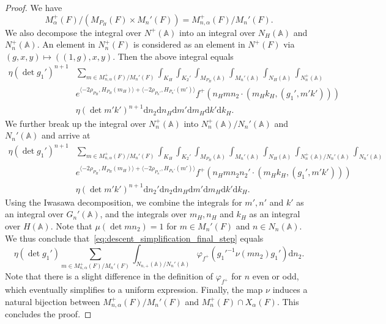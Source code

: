 \documentclass[10pt,a4paper]{amsart}
\newcommand{\bA}{\mathbb{A}}
\newcommand{\rd}{\mathrm{d}}
\begin{document}
\begin{proof}
We have
    \[
    M^+_{\alpha}(F)/ (M_{P_H}(F)\times
    M_n'(F))=M^+_{n,\alpha}(F)/M_n'(F).
    \]
We also decompose the integral over $N^+(\bA)$ into an integral over ${N_H(\bA)}$ and $N_n^+(\bA)$. An element in $N^+_n(F)$ is considered as an element in $N^+(F)$ via
$(g, x, y) \mapsto ((1, g), x, y)$. Then the above integral equals
    \begin{align*}
    \eta(\det g_1')^{n+1}
    &\sum_{m \in M^+_{n,\alpha}(F)/M_n'(F)}
    \int_{K_H} \int_{K_2'}
    \int_{M_{P_H}(\bA)} \int_{M_n'(\bA)}
    \int_{N_H(\bA)} \int_{N_{n}^+(\bA)}   \\
    & e^{\langle
    -2\rho_{P_H},H_{P_H}(m_H)\rangle+
    \langle -2\rho_{P_n'},H_{P_n'}(m') \rangle }
    f^+ \left(n_H m n_2 \cdot (m_H k_H, (g_1',m'k'))\right)\\
    &\eta(\det m'k')^{n+1} \rd n_2 \rd n_H \rd m' \rd m_H \rd k' \rd k_H.
    \end{align*}
We further break up the integral over $N_{n}^+(\bA)$ into
$N_{n}^+(\bA)/N_n'(\bA)$ and $N_n'(\bA)$ and arrive at
    \begin{equation}    \label{eq:descent_simplification_final_step}
    \begin{aligned}
    \eta(\det g_1')^{n+1}
    &\sum_{m \in M^+_{n,\alpha}(F)/M_n'(F)}
    \int_{K_H} \int_{K_2'}
    \int_{M_{P_H}(\bA)} \int_{M_n'(\bA)}
    \int_{N_H(\bA)} \int_{N_{n}^+(\bA)/N_n'(\bA)} \int_{N_n'(\bA)}   \\
    & e^{\langle
    -2\rho_{P_H},H_{P_H}(m_H)\rangle+
    \langle -2\rho_{P_n'},H_{P_n'}(m') \rangle }
    f^+ \left(n_H m n_2 n_2' \cdot (m_H k_H, (g_1', m'k'))\right)\\
    &\eta(\det m'k')^{n+1}
    \rd n_2' \rd n_2 \rd n_H \rd m' \rd m_H \rd k' \rd k_H.
    \end{aligned}
    \end{equation}
Using the Iwasawa decomposition, we combine the integrals for $m', n'$ and
$k'$ as an integral over $G_n'(\bA)$, and the integrals over $m_H, n_H$ and
$k_H$ as an integral over $H(\bA)$. Note that $\mu(\det mn_2)=1$ for $m \in
M_n'(F)$ and $n \in N_n(\bA)$. We thus conclude
that~\eqref{eq:descent_simplification_final_step} equals
    \[
    \eta(\det g_1') \sum_{m \in M^+_{n,\alpha}(F)/M_n'(F)}
    \int_{N_{n,+}(\bA)/N_n'(\bA)} \varphi_{f^+}
    \left(  g_1'^{-1}\nu(mn_2) g_1' \right)
    \rd n_2.
    \]
Note that there is a slight difference in the definition of $\varphi_{f^+}$
for $n$ even or odd, which eventually simplifies to a uniform expression.
Finally, the map $\nu$ induces a natural bijection between $M_{n,
\alpha}^+(F)/M_n'(F)$ and $M_{n}^+(F) \cap X_{\alpha}(F)$. This concludes
the proof.
\end{proof}
\end{document}
